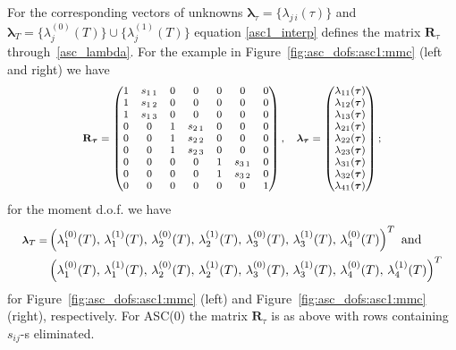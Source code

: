 \documentclass[12pt]{article}
\newcommand{\vect}[1]{\boldsymbol{\mathbf{#1}}}
\newcommand{\bcell}{T}
\newcommand{\mmesh}{{\vect{\mathcal \tau}}}
\newcommand{\bfaces}[1][]{{\vect{\mathcal F}_{\text{#1}}}}
\begin{document}
	For the corresponding vectors of unknowns  ${\vect \lambda}_\mmesh = \{ \lambda_{j\,i}(\mmesh) \}$ and ${\vect \lambda}_\bcell = \{ \lambda^{(0)}_{j}(\bcell) \} \cup \{ \lambda^{(1)}_{j}(\bcell) \}$ equation \eqref{asc1_interp} defines
	the matrix $\vect R_\mmesh$ through~\eqref{asc_lambda}. For the example in Figure~\ref{fig:asc_dofs:asc1:mmc} (left and right) we have
	\begin{equation*}\footnotesize
		\vect R_\mmesh
		=
		\begin{pmatrix}
			1 &  s_{1\,1} & 0 & 0 & 0 & 0 & 0 \\
			1 &  s_{1\,2} & 0 & 0 & 0 & 0 & 0 \\
			1 &  s_{1\,3} & 0 & 0 & 0 & 0 & 0 \\
			0 & 0 & 1 &  s_{2\,1} & 0 & 0 & 0 \\
			0 & 0 & 1 &  s_{2\,2} & 0 & 0 & 0 \\
			0 & 0 & 1 &  s_{2\,3} & 0 & 0 & 0 \\
			0 & 0 & 0 & 0 & 1 &  s_{3\,1} & 0 \\
			0 & 0 & 0 & 0 & 1 &  s_{3\,2} & 0 \\
			0 & 0 & 0 & 0 & 0 & 0 & 1
		\end{pmatrix},
		\quad
		\vect \lambda_\mmesh =
		\begin{pmatrix}
			\lambda_{11}(\mmesh) \\
			\lambda_{12}(\mmesh) \\
			\lambda_{13}(\mmesh) \\
			\lambda_{21}(\mmesh) \\
			\lambda_{22}(\mmesh) \\
			\lambda_{23}(\mmesh) \\
			\lambda_{31}(\mmesh) \\
			\lambda_{32}(\mmesh) \\
			\lambda_{41}(\mmesh) \\
		\end{pmatrix};	
	\end{equation*}
	for the moment d.o.f. we have
	\begin{align*}\footnotesize
		\vect \lambda_\bcell =&
		\left(
			\lambda^{(0)}_1(\bcell),\,
			\lambda^{(1)}_1(\bcell),\,
			\lambda^{(0)}_2(\bcell),\,
			\lambda^{(1)}_2(\bcell),\,
			\lambda^{(0)}_3(\bcell),\,
			\lambda^{(1)}_3(\bcell),\,
			\lambda^{(0)}_4(\bcell)
		\right)^T
		\text{ and} \\
		&\left(
			\lambda^{(0)}_1(\bcell),\,
			\lambda^{(1)}_1(\bcell),\,
			\lambda^{(0)}_2(\bcell),\,
			\lambda^{(1)}_2(\bcell),\,
			\lambda^{(0)}_3(\bcell),\,
			\lambda^{(1)}_3(\bcell),\,
			\lambda^{(0)}_4(\bcell),\,
			\lambda^{(1)}_4(\bcell)
		\right)^T		
	\end{align*}
	for Figure~\ref{fig:asc_dofs:asc1:mmc} (left) and Figure~\ref{fig:asc_dofs:asc1:mmc} (right), respectively. For ASC(0) the matrix $\vect R_\mmesh$  is as above with rows containing $s_{ij}$-s eliminated.
	
\end{document}
